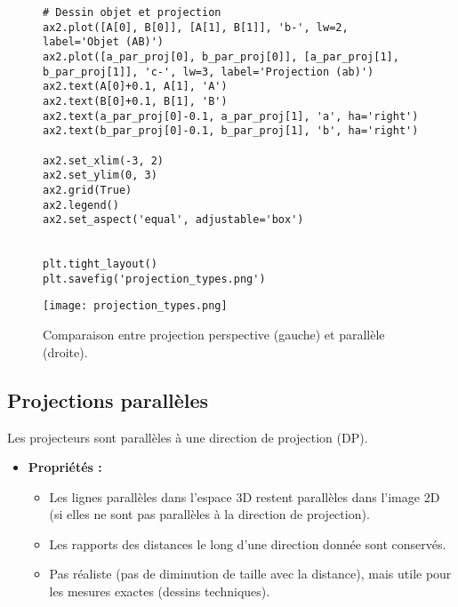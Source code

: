 \documentclass{article}
\begin{document}
\begin{figure}[H]
\begin{verbatim}
# Dessin objet et projection
ax2.plot([A[0], B[0]], [A[1], B[1]], 'b-', lw=2, label='Objet (AB)')
ax2.plot([a_par_proj[0], b_par_proj[0]], [a_par_proj[1], b_par_proj[1]], 'c-', lw=3, label='Projection (ab)')
ax2.text(A[0]+0.1, A[1], 'A')
ax2.text(B[0]+0.1, B[1], 'B')
ax2.text(a_par_proj[0]-0.1, a_par_proj[1], 'a', ha='right')
ax2.text(b_par_proj[0]-0.1, b_par_proj[1], 'b', ha='right')

ax2.set_xlim(-3, 2)
ax2.set_ylim(0, 3)
ax2.grid(True)
ax2.legend()
ax2.set_aspect('equal', adjustable='box')


plt.tight_layout()
plt.savefig('projection_types.png')
    \end{verbatim}
    \texttt{[image: projection\_types.png]}
    \caption{Comparaison entre projection perspective (gauche) et parallèle (droite).}
    \label{fig:projection_types}
\end{figure}

\subsection{Projections parallèles}

Les projecteurs sont parallèles à une direction de projection (DP).
\begin{itemize}
    \item \textbf{Propriétés :}
        \begin{itemize}
            \item Les lignes parallèles dans l'espace 3D restent parallèles dans l'image 2D (si elles ne sont pas parallèles à la direction de projection).
            \item Les rapports des distances le long d'une direction donnée sont conservés.
            \item Pas réaliste (pas de diminution de taille avec la distance), mais utile pour les mesures exactes (dessins techniques).
        \end{itemize}
\end{itemize}
\end{document}
